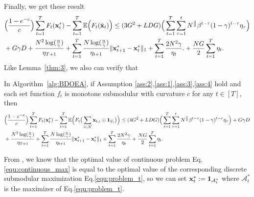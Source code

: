 	
Finally, we get these result 
\begin{equation*}
	\begin{aligned}
		&\Big(\frac{1-e^{-c}}{c}\Big)\sum_{t=1}^{T}F_{t}(\mathbf{x}^{*}_{t})-\sum_{t=1}^{T}\mathbb{E}\Big(F_{t}(\bar{\mathbf{x}}_{t})\Big)\le(3G^{2}+LDG)\Big(\sum_{t=1}^{T}\sum_{\tau=1}^{t}N^{\frac{3}{2}}\beta^{t-\tau}(1-\gamma)^{t-\tau}\eta_{\tau}\Big)\\&+G\gamma D+\frac{N^{2}\log(\frac{n}{\gamma})}{\eta_{T+1}}+\sum_{t=1}^{T}\frac{N\log(\frac{n}{\gamma})}{\eta_{t+1}}\|\mathbf{x}_{t+1}^{*}-\mathbf{x}_{t}^{*}\|_{1}+\sum_{t=1}^{T}\frac{2N^{2}\gamma}{\eta_{t}}.+\frac{NG}{2}\sum_{t=1}^{T}\eta_{t}.
			\end{aligned}
\end{equation*}
Like Lemma~\ref{thm:3}, we also can verify that 
	\begin{lemma}\label{thm:31}
	In Algorithm~\ref{alg:BDOEA}, if Assumption \ref{ass:2},\ref{ass:1},\ref{ass:3},\ref{ass:4} hold and each set function $f_{t}$ is monotone submodular with curvature $c$ for any $t\in[T]$, then
	\begin{equation*}
		\begin{aligned}
			&\Big(\frac{1-e^{-c}}{c}\Big)\sum_{t=1}^{T}F_{t}(\mathbf{x}^{*}_{t})-\sum_{t=1}^{T}\mathbb{E}\Big(F_{t}\big(\sum_{i\in\mathcal{N}}\mathbf{x}_{t,i}\odot\mathbf{1}_{\mathcal{V}_{i}}\big)\Big)\le(4G^{2}+LDG)\Big(\sum_{t=1}^{T}\sum_{\tau=1}^{t}N^{\frac{3}{2}}\beta^{t-\tau}(1-\gamma)^{t-\tau}\eta_{\tau}\Big)+G\gamma D\\&+\frac{N^{2}\log(\frac{n}{\gamma})}{\eta_{T+1}}+\sum_{t=1}^{T}\frac{N\log(\frac{n}{\gamma})}{\eta_{t+1}}\|\mathbf{x}_{t+1}^{*}-\mathbf{x}_{t}^{*}\|_{1}+\sum_{t=1}^{T}\frac{2N^{2}\gamma}{\eta_{t}}+\frac{NG}{2}\sum_{t=1}^{T}\eta_{t}.
		\end{aligned}
	\end{equation*}
\end{lemma}


From \citet{calinescu2011maximizing,chekuri2014submodular}, we know that the optimal value of continuous problem Eq.\eqref{equ:continuous_max} is equal to the optimal value of the corresponding discrete submodular maximization Eq.\eqref{equ:problem_t}, so we can set $\mathbf{x}^{*}_{t}:=\mathbf{1}_{\mathcal{A}_{t}^{*}}$ where $\mathcal{A}_{t}^{*}$ is the maximizer of Eq.\eqref{equ:problem_t}.


